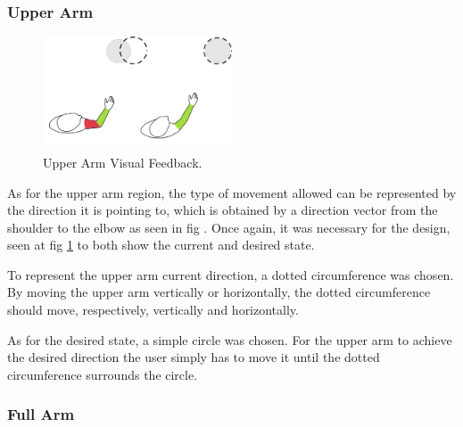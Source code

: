 \subsubsection{Upper Arm}

\begin{figure}[!t]
    \begin{center}
        \includegraphics[width=0.5\textwidth]{imgs/approach/upperarmfeedback}
    \end{center}
    \caption{Upper Arm Visual Feedback.}
    \label{fig:upperarmfeedback}
\end{figure}

As for the upper arm region, the type of movement allowed can be represented by the direction it is pointing to, 
which is obtained by a direction vector from the shoulder to the elbow as seen in fig .
Once again, it was necessary for the design, seen at fig \ref{fig:upperarmfeedback} to both show the current and desired state. 


To represent the upper arm current direction, a dotted circumference was chosen. 
By moving the upper arm vertically or horizontally, the dotted circumference should move, respectively, vertically and horizontally.


As for the desired state, a simple circle was chosen. 
For the upper arm to achieve the desired direction the user simply has to move it until the dotted circumference surrounds the circle.

\subsubsection{Full Arm}

